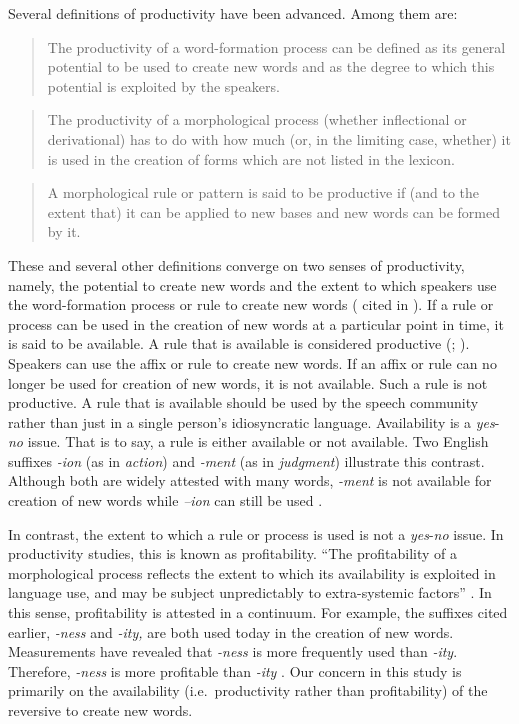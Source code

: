 \documentclass[output=paper]{langsci/langscibook}
\begin{document}
Several definitions of productivity have been advanced. Among them are: 

\begin{quote}
The productivity of a word-formation process can be defined as its general potential to be used to create new words and as the degree to which this potential is exploited by the speakers. \citep[127]{Plag2006}
\end{quote}

\begin{quote}
The productivity of a morphological process (whether inflectional or derivational) has to do with how much (or, in the limiting case, whether) it is used in the creation of forms which are not listed in the lexicon. \citep[315]{Bauer2005}
\end{quote}

\begin{quote}
A morphological rule or pattern is said to be productive if (and to the extent that) it can be applied to new bases and new words can be formed by it. \citep[114]{HaspelmathSims2010}
\end{quote}

These and several other definitions converge on two senses of productivity, namely, the potential to create new words and the extent to which speakers use the word-formation process or rule to create new words (\citealt{Corbin1987} cited in \citealt{Bauer2001}). If a rule or process can be used in the creation of new words at a particular point in time, it is said to be available. A rule that is available is considered productive (\citealt[205]{Bauer2001}; \citealt{Plag2006}). Speakers can use the affix or rule to create new words. If an affix or rule can no longer be used for creation of new words, it is not available. Such a rule is not productive. A rule that is available should be used by the speech community rather than just in a single person’s idiosyncratic language. Availability is a \textit{yes}{}-\textit{no} issue. That is to say, a rule is either available or not available. Two English suffixes \textit{{}-ion} (as in \textit{action}) and \textit{{}-ment} (as in \textit{judgment}) illustrate this contrast. Although both are widely attested with many words, \textit{{}-ment} is not available for creation of new words while \textit{–ion} can still be used \citep{Bauer2001}. 

In contrast, the extent to which a rule or process is used is not a \textit{yes}-\textit{no} issue. In productivity studies, this is known as profitability. “The profitability of a morphological process reflects the extent to which its availability is exploited in language use, and may be subject unpredictably to extra-systemic factors” \citep[211]{Bauer2001}. In this sense, profitability is attested in a continuum. For example, the suffixes cited earlier, \textit{{}-ness} and \textit{{}-ity,} are both used today in the creation of new words. Measurements have revealed that \textit{{}-ness} is more frequently used than \textit{{}-ity}. Therefore, \textit{{}-ness} is more profitable than \textit{{}-ity} \citep{Plag2006}. Our concern in this study is primarily on the availability (i.e.\ productivity rather than profitability) of the reversive to create new words. 
\end{document}
